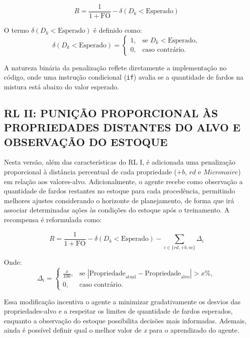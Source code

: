 \documentclass[
    12pt,                %
    openright,           %
    oneside,             %
    a4paper,             %
    english,             %
    spanish,             %
    brazil               %
]{ufscar}
\begin{document}
\begin{equation}
R = \frac{1}{1 + \text{FO}} - \delta(D_k < \text{Esperado})
\end{equation}

O termo \(\delta(D_k < \text{Esperado})\) é definido como:
\[
\delta(D_k < \text{Esperado}) =
\begin{cases} 
1, & \text{se } D_k < \text{Esperado}, \\
0, & \text{caso contrário.}
\end{cases}
\]

A natureza binária da penalização reflete diretamente a implementação no código, onde uma instrução condicional (\texttt{if}) avalia se a quantidade de fardos na mistura está abaixo do valor esperado. 

\subsection{RL II: PUNIÇÃO PROPORCIONAL ÀS PROPRIEDADES DISTANTES DO ALVO E OBSERVAÇÃO DO ESTOQUE}

Nesta versão, além das características do RL I, é adicionada uma penalização proporcional à distância percentual de cada propriedade (\(+b\), \(rd\) e \(Micronaire\)) em relação aos valores-alvo. Adicionalmente, o agente recebe como observação a quantidade de fardos restantes no estoque para cada procedência, permitindo melhores ajustes considerando o horizonte de planejamento, de forma que irá associar determinadas ações às condições do estoque após o treinamento. A recompensa é reformulada como:

\begin{equation}
R = \frac{1}{1 + \text{FO}} - \delta(D_k < \text{Esperado}) - \sum_{i \in \{rd, +b, m\}} \Delta_i
\end{equation}

Onde:
\begin{equation}
\Delta_i =
\begin{cases} 
\frac{x}{100}, & \text{se } \left| \text{Propriedade}_{\text{atual}} - \text{Propriedade}_{\text{alvo}} \right| > x\%, \\
0, & \text{caso contrário.}
\end{cases}
\end{equation}

Essa modificação incentiva o agente a minimizar gradativamente os desvios das propriedades-alvo e a respeitar os limites de quantidade de fardos esperados, enquanto a observação do estoque possibilita decisões mais informadas. Ademais, ainda é possível definir qual o melhor valor de \textit{x} para o aprendizado do agente.
\end{document}

